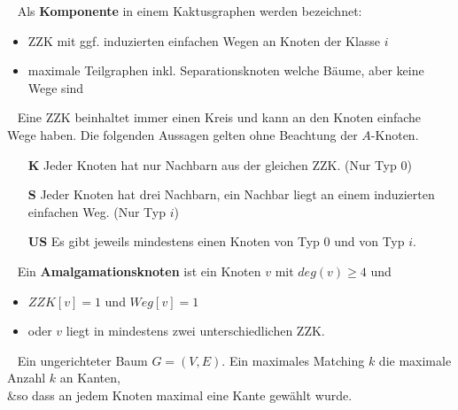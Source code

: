 \begin{defi}[Komponente]~\newline
Als \textbf{Komponente} in einem Kaktusgraphen werden bezeichnet:\vspace{-1mm}
\begin{itemize}
\item ZZK mit ggf. induzierten einfachen Wegen an Knoten der Klasse $i$\vspace{-1mm}
\item maximale Teilgraphen inkl. Separationsknoten welche Bäume, aber keine Wege sind 
\end{itemize}
\end{defi}
\vspace{-1mm}
\begin{defi}~\newline
Eine ZZK beinhaltet immer einen Kreis und kann an den Knoten einfache Wege haben. Die folgenden Aussagen gelten ohne Beachtung der $A$-Knoten.\vspace{-1mm} 
\begin{itemize}
\item[\textbf{K}] Jeder Knoten hat nur Nachbarn aus der gleichen ZZK. (Nur Typ $0$)\vspace{-1mm}
\item[\textbf{S}] Jeder Knoten hat drei Nachbarn, ein Nachbar liegt an einem induzierten einfachen Weg. (Nur Typ $i$)\vspace{-1mm}
\item[\textbf{US}] Es gibt jeweils mindestens einen Knoten von Typ $0$ und von Typ $i$.
\end{itemize}
\end{defi}
\vspace{-1mm}
\begin{defi}[Amalgamationsknoten]~\newline
Ein \textbf{Amalgamationsknoten} ist ein Knoten $v$ mit $deg(v)\geq 4$ und \vspace{-1mm}
\begin{itemize}
\item $ZZK[v]=1$ und $Weg[v]=1$\vspace{-1mm}
\item oder $v$ liegt in mindestens zwei unterschiedlichen ZZK.
\end{itemize}
\end{defi}
\vspace{-1mm}
\begin{defi}~\newline
\vspace{-7mm}
{Ein ungerichteter Baum $G=(V,E)$.}
{Ein maximales Matching $k$ die maximale Anzahl $k$ an Kanten,\\&so dass an jedem Knoten maximal eine Kante gewählt wurde.}
\end{defi}
\vspace{-5mm}
\newpage
